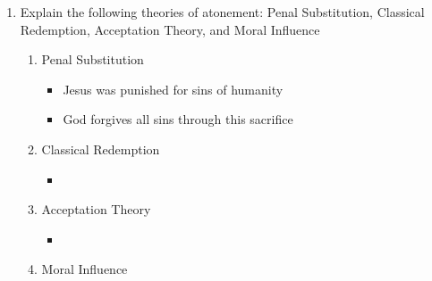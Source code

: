 \documentclass[8pt]{article}
\begin{document}
\begin{enumerate}
    \item Explain the following theories of atonement: Penal Substitution, Classical Redemption, Acceptation Theory, and Moral Influence
    \begin{enumerate}
        \item Penal Substitution
        \begin{itemize}
            \item Jesus was punished for sins of humanity
            \item God forgives all sins through this sacrifice
        \end{itemize}
        \item Classical Redemption
        \begin{itemize}
            \item
        \end{itemize}
        \item Acceptation Theory
        \begin{itemize}
            \item
        \end{itemize}
        \item Moral Influence
    \end{enumerate}


\end{enumerate}
\end{document}
